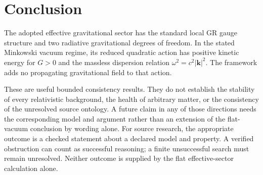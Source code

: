 \documentclass[11pt]{article}
\begin{document}
\section{Conclusion}
The adopted effective gravitational sector has the standard local GR gauge structure and two radiative gravitational degrees of freedom. In the stated Minkowski vacuum regime, its reduced quadratic action has positive kinetic energy for $G>0$ and the massless dispersion relation $\omega^2=c^2|\mathbf k|^2$. The framework adds no propagating \Aflow{} gravitational field to that action.

These are useful bounded consistency results. They do not establish the stability of every relativistic background, the health of arbitrary matter, or the consistency of the unresolved source ontology. A future claim in any of those directions needs the corresponding model and argument rather than an extension of the flat-vacuum conclusion by wording alone.
For source research, the appropriate outcome is a checked statement about a declared model and property. A verified obstruction can count as successful reasoning; a finite unsuccessful search must remain unresolved. Neither outcome is supplied by the flat effective-sector calculation alone.

\References
\end{document}
